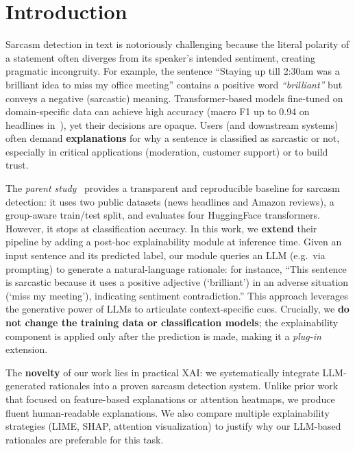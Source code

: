 
\section{Introduction}\label{sec:introduction}

Sarcasm detection in text is notoriously challenging because the literal polarity of a statement often diverges from its speaker's intended sentiment, creating pragmatic incongruity. For example, the sentence ``Staying up till 2:30am was a brilliant idea to miss my office meeting'' contains a positive word \emph{``brilliant''} but conveys a negative (sarcastic) meaning. Transformer-based models fine-tuned on domain-specific data can achieve high accuracy (macro F1 up to 0.94 on headlines in~\cite{oprea2025llm}), yet their decisions are opaque. Users (and downstream systems) often demand \textbf{explanations} for why a sentence is classified as sarcastic or not, especially in critical applications (moderation, customer support) or to build trust.

The \emph{parent study}~\cite{oprea2025llm} provides a transparent and reproducible baseline for sarcasm detection: it uses two public datasets (news headlines and Amazon reviews), a group-aware train/test split, and evaluates four HuggingFace transformers. However, it stops at classification accuracy. In this work, we \textbf{extend} their pipeline by adding a post-hoc explainability module at inference time. Given an input sentence and its predicted label, our module queries an LLM (e.g.\ via prompting) to generate a natural-language rationale: for instance, ``This sentence is sarcastic because it uses a positive adjective (`brilliant') in an adverse situation (`miss my meeting'), indicating sentiment contradiction.'' This approach leverages the generative power of LLMs to articulate context-specific cues. Crucially, we \textbf{do not change the training data or classification models}; the explainability component is applied only after the prediction is made, making it a \emph{plug-in} extension.

The \textbf{novelty} of our work lies in practical XAI: we systematically integrate LLM-generated rationales into a proven sarcasm detection system. Unlike prior work that focused on feature-based explanations or attention heatmaps, we produce fluent human-readable explanations. We also compare multiple explainability strategies (LIME, SHAP, attention visualization) to justify why our LLM-based rationales are preferable for this task.

